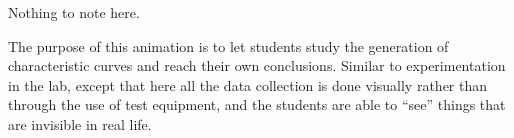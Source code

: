 Nothing to note here.







The purpose of this animation is to let students study the generation of characteristic curves and reach their own conclusions.  Similar to experimentation in the lab, except that here all the data collection is done visually rather than through the use of test equipment, and the students are able to ``see'' things that are invisible in real life.




